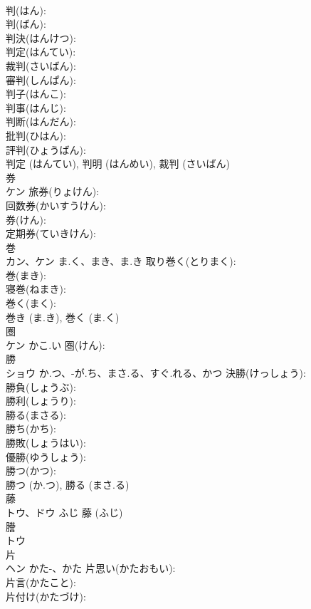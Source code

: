 \documentclass[8pt]{extreport}
\begin{document}
\begin{CJK}{UTF8}{min}
\\	判(はん): 
\\	判(ばん): 
\\	判決(はんけつ): 
\\	判定(はんてい): 
\\	裁判(さいばん): 
\\	審判(しんぱん): 
\\	判子(はんこ): 
\\	判事(はんじ): 
\\	判断(はんだん): 
\\	批判(ひはん): 
\\	評判(ひょうばん): 
\\	判定 (はんてい), 判明 (はんめい), 裁判 (さいばん)
\\	券			
\\	ケン		旅券(りょけん): 
\\	回数券(かいすうけん): 
\\	券(けん): 
\\	定期券(ていきけん): 
\\	巻			
\\	カン、ケン	ま.く、まき、ま.き	取り巻く(とりまく): 
\\	巻(まき): 
\\	寝巻(ねまき): 
\\	巻く(まく): 
\\	巻き (ま.き), 巻く (ま.く)
\\	圏			
\\	ケン	かこ.い	圏(けん): 
\\	勝			
\\	ショウ	か.つ、-が.ち、まさ.る、すぐ.れる、かつ	決勝(けっしょう): 
\\	勝負(しょうぶ): 
\\	勝利(しょうり): 
\\	勝る(まさる): 
\\	勝ち(かち): 
\\	勝敗(しょうはい): 
\\	優勝(ゆうしょう): 
\\	勝つ(かつ): 
\\	勝つ (か.つ), 勝る (まさ.る)
\\	藤			
\\	トウ、ドウ	ふじ		藤 (ふじ)
\\	謄			
\\	トウ			
\\	片			
\\	ヘン	かた-、かた	片思い(かたおもい): 
\\	片言(かたこと): 
\\	片付け(かたづけ): 

\end{CJK}
\end{document}
